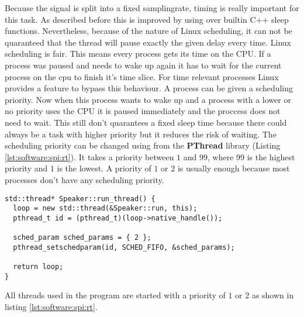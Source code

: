 Because the signal is split into a fixed samplingrate, timing is really important for this task. As described before this is improved by using  over builtin C++ sleep functions. Nevertheless, because of the nature of Linux scheduling, it can not be quaranteed that the thread will pause exactly the given delay every time. Linux scheduling is fair. This means every process gets its time on the CPU. If a process was paused and needs to wake up again it has to wait for the current process on the cpu to finish it's time slice. For time relevant processes Linux provides a feature to bypass this behaviour. A process can be given a scheduling priority. Now when this process wants to wake up and a process with a lower or no priority uses the CPU it is paused immediately and the proccess does not need to wait. This still don't quarantees a fixed sleep time because there could always be a task with higher priority but it reduces the risk of waiting.\cite{faschingbauer_realtime_nodate}\p
%
The scheduling priority can be changed using  from the \textbf{PThread} library (Listing \ref{lst:software:spi:rt}). It takes a priority between $1$ and $99$, where $99$ is the highest priority and $1$ is the lowest. A priority of $1$ or $2$ is usually enough because most processes don't have any scheduling priority.\cite{noauthor_pthread_setschedparam3_nodate}
%
\begin{mdframed}
\begin{lstlisting}[caption=Example for creating a thread with realtime priority, label=lst:software:spi:rt]
std::thread* Speaker::run_thread() {
  loop = new std::thread(&Speaker::run, this);
  pthread_t id = (pthread_t)(loop->native_handle());

  sched_param sched_params = { 2 };
  pthread_setschedparam(id, SCHED_FIFO, &sched_params);

  return loop;
}
\end{lstlisting}
\end{mdframed}
%
All threads used in the program are started with a priority of $1$ or $2$ as shown in listing \ref{lst:software:spi:rt}.